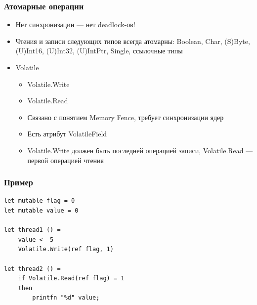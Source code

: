 \documentclass{../../slides-style}
\begin{document}
    \begin{frame}
        \frametitle{Атомарные операции}
        \begin{itemize}
            \item Нет синхронизации --- нет deadlock-ов!
            \item Чтения и записи следующих типов всегда атомарны: Boolean, Char, (S)Byte, (U)Int16, (U)Int32, (U)IntPtr, Single, ссылочные типы
            \item Volatile
            \begin{itemize}
                \item Volatile.Write
                \item Volatile.Read
                \item Связано с понятием Memory Fence, требует синхронизации ядер
                \item Есть атрибут VolatileField
                \item Volatile.Write должен быть последней операцией записи, Volatile.Read --- первой операцией чтения
            \end{itemize}
        \end{itemize}
    \end{frame}

    \begin{frame}[fragile]
        \frametitle{Пример}
        \begin{verbatim}
let mutable flag = 0
let mutable value = 0

let thread1 () = 
    value <- 5
    Volatile.Write(ref flag, 1)

let thread2 () =
    if Volatile.Read(ref flag) = 1 
    then
        printfn "%d" value;
        \end{verbatim}
    \end{frame}
\end{document}
